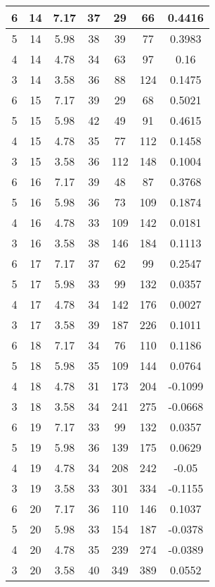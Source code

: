 \documentclass[letterpaper, 12pt]{article}
\begin{document}
\begin{longtable}{|c|c|c|c|c|c|c|}
\hline
6 & 14 & 7.17 & 37 & 29 & 66 & 0.4416 \\
\hline
5 & 14 & 5.98 & 38 & 39 & 77 & 0.3983 \\
\hline
4 & 14 & 4.78 & 34 & 63 & 97 & 0.16 \\
\hline
3 & 14 & 3.58 & 36 & 88 & 124 & 0.1475 \\
\hline
6 & 15 & 7.17 & 39 & 29 & 68 & 0.5021 \\
\hline
5 & 15 & 5.98 & 42 & 49 & 91 & 0.4615 \\
\hline
4 & 15 & 4.78 & 35 & 77 & 112 & 0.1458 \\
\hline
3 & 15 & 3.58 & 36 & 112 & 148 & 0.1004 \\
\hline
6 & 16 & 7.17 & 39 & 48 & 87 & 0.3768 \\
\hline
5 & 16 & 5.98 & 36 & 73 & 109 & 0.1874 \\
\hline
4 & 16 & 4.78 & 33 & 109 & 142 & 0.0181 \\
\hline
3 & 16 & 3.58 & 38 & 146 & 184 & 0.1113 \\
\hline
6 & 17 & 7.17 & 37 & 62 & 99 & 0.2547 \\
\hline
5 & 17 & 5.98 & 33 & 99 & 132 & 0.0357 \\
\hline
4 & 17 & 4.78 & 34 & 142 & 176 & 0.0027 \\
\hline
3 & 17 & 3.58 & 39 & 187 & 226 & 0.1011 \\
\hline
6 & 18 & 7.17 & 34 & 76 & 110 & 0.1186 \\
\hline
5 & 18 & 5.98 & 35 & 109 & 144 & 0.0764 \\
\hline
4 & 18 & 4.78 & 31 & 173 & 204 & -0.1099 \\
\hline
3 & 18 & 3.58 & 34 & 241 & 275 & -0.0668 \\
\hline
6 & 19 & 7.17 & 33 & 99 & 132 & 0.0357 \\
\hline
5 & 19 & 5.98 & 36 & 139 & 175 & 0.0629 \\
\hline
4 & 19 & 4.78 & 34 & 208 & 242 & -0.05 \\
\hline
3 & 19 & 3.58 & 33 & 301 & 334 & -0.1155 \\
\hline
6 & 20 & 7.17 & 36 & 110 & 146 & 0.1037 \\
\hline
5 & 20 & 5.98 & 33 & 154 & 187 & -0.0378 \\
\hline
4 & 20 & 4.78 & 35 & 239 & 274 & -0.0389 \\
\hline
3 & 20 & 3.58 & 40 & 349 & 389 & 0.0552 \\
\hline
\end{longtable}
\end{document}
